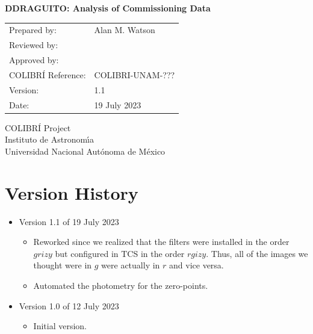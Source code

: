 \documentclass{article}
\begin{document}
\pagestyle{empty}

\begin{center}

{\Large \bfseries DDRAGUITO: Analysis of Commissioning Data}

\vspace{2cm}

\begin{tabular}{ll}
Prepared by:&Alan M. Watson\\
Reviewed by:&\\
Approved by:&\\
COLIBRÍ Reference:&COLIBRI-UNAM-???\\
Version:&1.1\\
Date:&19 July 2023\\
\end{tabular}

\vspace{\fill}

COLIBRÍ Project\\
Instituto de Astronom{\'\i}a\\
Universidad Nacional Aut\'onoma de M\'exico

\end{center}

\clearpage

\clearpage
\section*{Version History}

\begin{itemize}

\item Version 1.1 of 19 July 2023

\begin{itemize}
\item Reworked since we realized that the filters were installed in the order $grizy$ but configured in TCS in the order $rgizy$. Thus, all of the images we thought were in $g$ were actually in $r$ and vice versa.
\item Automated the photometry for the zero-points.
\end{itemize}

\item Version 1.0 of 12 July 2023

\begin{itemize}
    \item Initial version.
\end{itemize}

\end{itemize}
\end{document}
